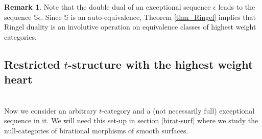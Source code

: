 \documentclass[12pt,a4paper]{amsart}
\newcommand{\aA}{{\mathcal{A}}}
\newcommand{\bB}{{\mathcal{B}}}
\newcommand{\dD}{{\mathcal{D}}}
\newcommand{\tr}{{\mbox{$t$-struc}\-tu\-r}}
\theoremstyle{definition}
\newtheorem{REM}[LEM]{Remark}
\begin{document}
\begin{REM}\label{involut}
Note that the double dual of an exceptional sequence $\epsilon$ leads to the sequence $\mathbb{S}\epsilon$. Since $\mathbb{S}$ is an auto-equivalence, Theorem \ref{thm_Ringel} implies that Ringel duality is an involutive operation on equivalence classes of highest weight categories.
\end{REM}

\vspace{0.3cm}
\subsection{Restricted \tr e with the highest weight heart}~\\

Now we consider an arbitrary $t$-category and a (not necessarily full) exceptional sequence in it. We will need this set-up in section \ref{birat-surf} where we study the null-categories of birational morphisms of smooth surfaces.
\end{document}
